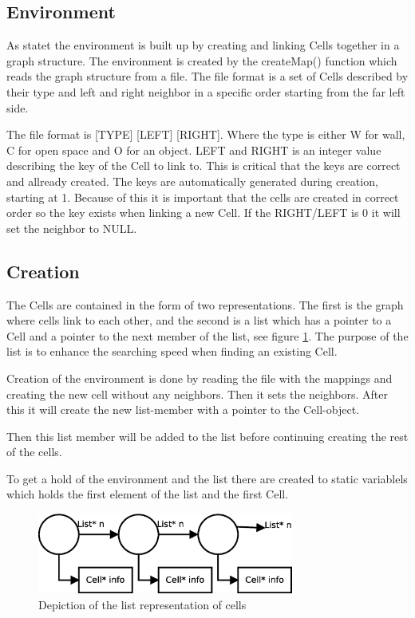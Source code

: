 \subsection{Environment}

As statet the environment is built up by creating and linking Cells together in
a graph structure. The environment is created by the createMap() function which
reads the graph structure from a file.  The file format is a set of Cells
described by their type and left and right neighbor in a specific order starting
from the far left side.

The file format is [TYPE] [LEFT] [RIGHT]. Where the type is either W for wall, C
for open space and O for an object. LEFT and RIGHT is an integer value
describing the key of the Cell to link to.  This is critical that the keys are
correct and allready created.  The keys are automatically generated during
creation, starting at 1.  Because of this it is important that the cells are
created in correct order so the key exists when linking a new Cell.  If the
RIGHT/LEFT is 0 it will set the neighbor to NULL.

\subsection{Creation}
The Cells are contained in the form of two representations.  The first is the
graph where cells link to each other, and the second is a list which has a
pointer to a Cell and a pointer to the next member of the list, see figure
\ref{fig:list}. The purpose of the list is to enhance the searching speed when 
finding an existing Cell.

Creation of the environment is done by reading the file with the mappings and
creating the new cell without any neighbors. Then it sets the neighbors. After
this it will create the new list-member with a pointer to the Cell-object.

Then this list member will be added to the list before continuing creating the
rest of the cells.

To get a hold of the environment and the list there are created to static
variablels which holds the first element of the list and the first Cell.

\begin{figure}[h] \label{fig:list}	\centering
\includegraphics[width=0.75\textwidth]{list}
\caption{Depiction of the list representation of cells}
\end{figure}

